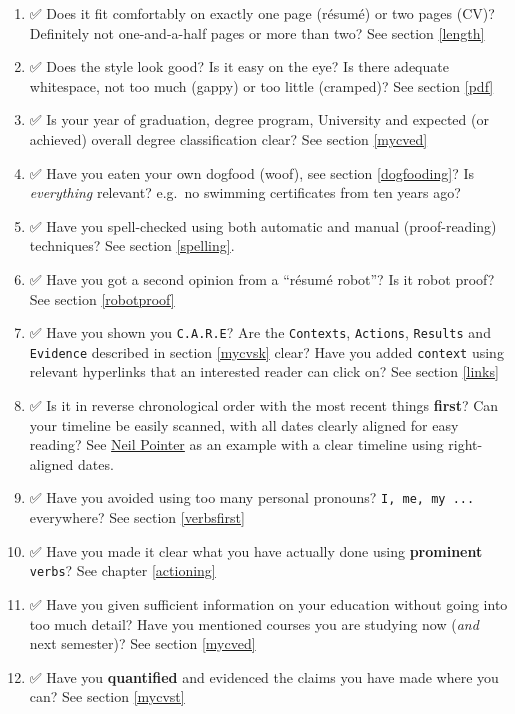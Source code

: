 \documentclass[
]{book}
\providecommand{\tightlist}{%
  \setlength{\itemsep}{0pt}\setlength{\parskip}{0pt}}
\begin{document}
\begin{enumerate}
\def\labelenumi{\arabic{enumi}.}
\tightlist
\item
  ✅ Does it fit comfortably on exactly one page (résumé) or two pages (CV)? Definitely not one-and-a-half pages or more than two? See section \ref{length}
\item
  ✅ Does the style look good? Is it easy on the eye? Is there adequate whitespace, not too much (gappy) or too little (cramped)? See section \ref{pdf}
\item
  ✅ Is your year of graduation, degree program, University and expected (or achieved) overall degree classification clear? See section \ref{mycved}
\item
  ✅ Have you eaten your own dogfood (woof), see section \ref{dogfooding}? Is \emph{everything} relevant? e.g.~no swimming certificates from ten years ago?
\item
  ✅ Have you spell-checked using both automatic and manual (proof-reading) techniques? See section \ref{spelling}.
\item
  ✅ Have you got a second opinion from a ``résumé robot''? Is it robot proof? See section \ref{robotproof} 🤖
\item
  ✅ Have you shown you \texttt{C.A.R.E}? Are the \texttt{Contexts}, \texttt{Actions}, \texttt{Results} and \texttt{Evidence} described in section \ref{mycvsk} clear? Have you added \texttt{context} using relevant hyperlinks that an interested reader can click on? See section \ref{links}
\item
  ✅ Is it in reverse chronological order with the most recent things \textbf{first}? Can your timeline be easily scanned, with all dates clearly aligned for easy reading? See \href{https://www.cdyf.me/Neil_Pointer.pdf}{Neil Pointer} as an example with a clear timeline using right-aligned dates.
\item
  ✅ Have you avoided using too many personal pronouns? \texttt{I,\ me,\ my\ ...} everywhere? See section \ref{verbsfirst}
\item
  ✅ Have you made it clear what you have actually done using \textbf{prominent} \texttt{verbs}? See chapter \ref{actioning}
\item
  ✅ Have you given sufficient information on your education without going into too much detail? Have you mentioned courses you are studying now (\emph{and} next semester)? See section \ref{mycved}
\item
  ✅ Have you \textbf{quantified} and evidenced the claims you have made where you can? See section \ref{mycvst}

\end{enumerate}
\end{document}

